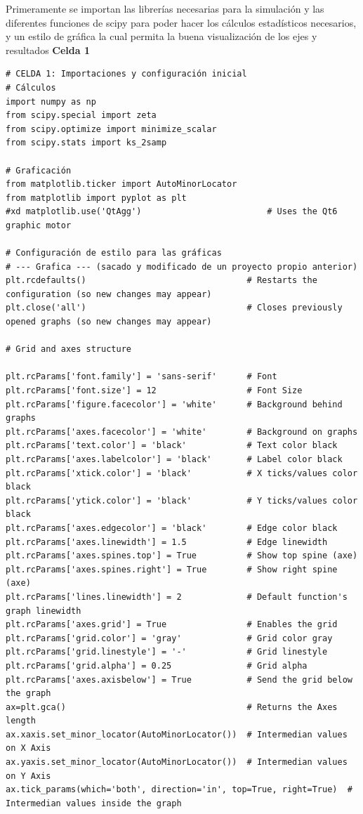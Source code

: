 \documentclass[twoside, a4paper, 12pt, spanish]{article}
\begin{document}
Primeramente se importan las librerías necesarias para la simulación y las diferentes funciones de scipy para poder hacer los cálculos estadísticos necesarios, y un estilo de gráfica la cual permita la buena visualización de los ejes y resultados 
\textbf{Celda 1}
\begin{lstlisting}
# CELDA 1: Importaciones y configuración inicial
# Cálculos
import numpy as np
from scipy.special import zeta
from scipy.optimize import minimize_scalar
from scipy.stats import ks_2samp

# Graficación
from matplotlib.ticker import AutoMinorLocator
from matplotlib import pyplot as plt
#xd matplotlib.use('QtAgg')                         # Uses the Qt6 graphic motor

# Configuración de estilo para las gráficas
# --- Grafica --- (sacado y modificado de un proyecto propio anterior)
plt.rcdefaults()                                # Restarts the configuration (so new changes may appear)
plt.close('all')                                # Closes previously opened graphs (so new changes may appear)

# Grid and axes structure

plt.rcParams['font.family'] = 'sans-serif'      # Font
plt.rcParams['font.size'] = 12                  # Font Size
plt.rcParams['figure.facecolor'] = 'white'      # Background behind graphs
plt.rcParams['axes.facecolor'] = 'white'        # Background on graphs
plt.rcParams['text.color'] = 'black'            # Text color black
plt.rcParams['axes.labelcolor'] = 'black'       # Label color black
plt.rcParams['xtick.color'] = 'black'           # X ticks/values color black
plt.rcParams['ytick.color'] = 'black'           # Y ticks/values color black
plt.rcParams['axes.edgecolor'] = 'black'        # Edge color black
plt.rcParams['axes.linewidth'] = 1.5            # Edge linewidth
plt.rcParams['axes.spines.top'] = True          # Show top spine (axe)
plt.rcParams['axes.spines.right'] = True        # Show right spine (axe)
plt.rcParams['lines.linewidth'] = 2             # Default function's graph linewidth
plt.rcParams['axes.grid'] = True                # Enables the grid
plt.rcParams['grid.color'] = 'gray'             # Grid color gray
plt.rcParams['grid.linestyle'] = '-'            # Grid linestyle
plt.rcParams['grid.alpha'] = 0.25               # Grid alpha
plt.rcParams['axes.axisbelow'] = True           # Send the grid below the graph
ax=plt.gca()                                    # Returns the Axes length
ax.xaxis.set_minor_locator(AutoMinorLocator())  # Intermedian values on X Axis
ax.yaxis.set_minor_locator(AutoMinorLocator())  # Intermedian values on Y Axis
ax.tick_params(which='both', direction='in', top=True, right=True)  # Intermedian values inside the graph
\end{lstlisting}
\end{document}
